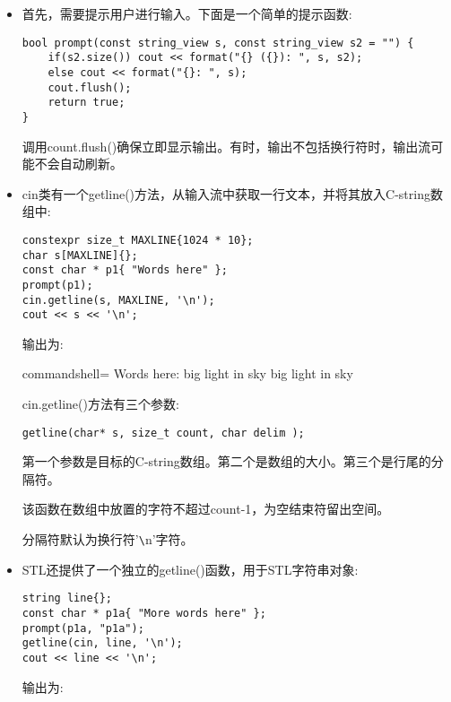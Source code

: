 \begin{itemize}
\item 
首先，需要提示用户进行输入。下面是一个简单的提示函数:

\begin{lstlisting}[style=styleCXX]
bool prompt(const string_view s, const string_view s2 = "") {
	if(s2.size()) cout << format("{} ({}): ", s, s2);
	else cout << format("{}: ", s);
	cout.flush();
	return true;
}
\end{lstlisting}

调用count.flush()确保立即显示输出。有时，输出不包括换行符时，输出流可能不会自动刷新。

\item 
cin类有一个getline()方法，从输入流中获取一行文本，并将其放入C-string数组中:

\begin{lstlisting}[style=styleCXX]
constexpr size_t MAXLINE{1024 * 10};
char s[MAXLINE]{};
const char * p1{ "Words here" };
prompt(p1);
cin.getline(s, MAXLINE, '\n');
cout << s << '\n';
\end{lstlisting}

输出为:

\begin{tcblisting}{commandshell={}}
Words here: big light in sky
big light in sky
\end{tcblisting}

cin.getline()方法有三个参数:

\begin{lstlisting}[style=styleCXX]
getline(char* s, size_t count, char delim );
\end{lstlisting}

第一个参数是目标的C-string数组。第二个是数组的大小。第三个是行尾的分隔符。

该函数在数组中放置的字符不超过count-1，为空结束符留出空间。

分隔符默认为换行符'\verb|\|n'字符。

\item 
STL还提供了一个独立的getline()函数，用于STL字符串对象:

\begin{lstlisting}[style=styleCXX]
string line{};
const char * p1a{ "More words here" };
prompt(p1a, "p1a");
getline(cin, line, '\n');
cout << line << '\n';
\end{lstlisting}

输出为:



\end{itemize}

